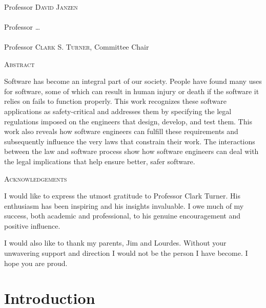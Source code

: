 \documentclass[12pt]{report}
\newcommand{\committeechair}{\textsc{Clark S. Turner}}
\newcommand{\committeeA}{\textsc{David Janzen}}
\newcommand{\committeeB}{\textsc{\ldots}}
\begin{document}
\singlespace 
\noindent\makebox[4in]{\hrulefill}\\ 
Professor \committeeA\\[2cm] 

\noindent\makebox[4in]{\hrulefill}\\ 
Professor \committeeB\\[2cm] 

\noindent\makebox[4in]{\hrulefill}\\ 
Professor \committeechair, Committee Chair\\[4cm] 

\doublespace 

\newpage 

\begin{center}\textsc{\large Abstract}\\[1cm]\end{center} 
Software has become an integral part of our society. People have found many uses for software, some of which can result in human injury or death if the software it relies on fails to function properly. This work recognizes these software applications as safety-critical and addresses them by specifying the legal regulations imposed on the engineers that design, develop, and test them. This work also reveals how software engineers can fulfill these requirements and subsequently influence the very laws that constrain their work. The interactions between the law and software process show how software engineers can deal with the legal implications that help ensure better, safer software. 
\newpage 

\begin{center}\textsc{\large Acknowledgements}\\[1cm]\end{center} 
I would like to express the utmost gratitude to Professor Clark Turner. His enthusiasm has been inspiring and his insights invaluable. I owe much of my success, both academic and professional, to his genuine encouragement and positive influence. 


I would also like to thank my parents, Jim and Lourdes. Without your unwavering support and direction I would not be the person I have become. I hope you are proud. 

\tableofcontents 
\listoffigures{} 


\chapter{Introduction} 
\end{document}
